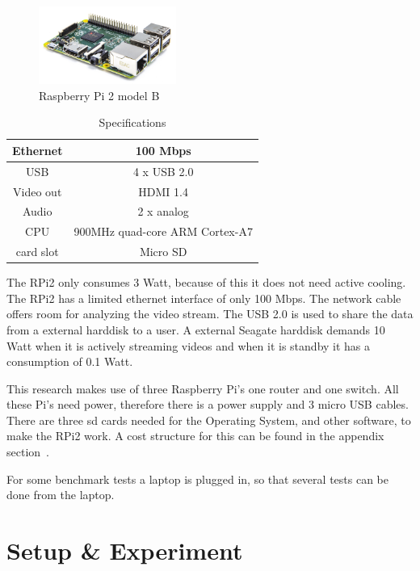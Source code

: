 \documentclass{sig-alternate-br}
\begin{document}
\begin{figure}[H]
	\centering 
	\includegraphics[width=0.4\textwidth]{Pi2ModB1GB_-comp.jpeg}
	\caption{Raspberry Pi 2 model B \cite{raspberry-pi}}
	\label{fig:raspberry} %
\end{figure}
\begin{table}[H]
	\centering \caption{Specifications \cite{raspberry-pi}}
	\begin{tabular}{|c|c|} \hline
		Ethernet & 100 Mbps \\ \hline
		USB & 4 x USB 2.0 \\ \hline
		Video out & HDMI 1.4 \\ \hline
		Audio & 2 x analog \\ \hline
		CPU & 900MHz quad-core ARM Cortex-A7 \\ \hline
		card slot & Micro SD  \\ \hline
	\end{tabular}
	\label{tab:Specificaties}
\end{table}
The RPi2 only consumes 3 Watt, because of this it does not need active cooling. The RPi2 has a limited ethernet interface of only 100 Mbps. The network cable offers room for analyzing the video stream. The USB 2.0 is used to share the data from a external harddisk to a user. A external Seagate harddisk demands 10 Watt when it is actively streaming videos and when it is standby it has a consumption of 0.1  Watt.

This research makes use of three Raspberry Pi's one router and one switch. All these Pi's need power, therefore there is a power supply and 3 micro USB cables. There are three sd cards needed for the Operating System, and other software, to make the RPi2 work. A cost structure for this can be found in the appendix section~.

For some benchmark tests a laptop is plugged in, so that several tests can be done from the laptop.


\section{Setup \& Experiment}\label{sec:setupex}
\end{document}
